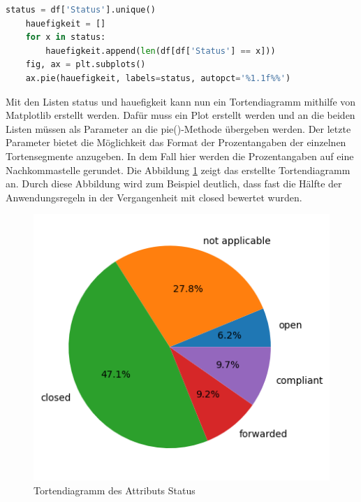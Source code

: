 \begin{lstlisting}[language = python, caption={Visualisierung des Attributs Status},captionpos=b, label = lst:StatusPie, floatplacement=H]
    status = df['Status'].unique()
    hauefigkeit = []
    for x in status:
        hauefigkeit.append(len(df[df['Status'] == x]))
    fig, ax = plt.subplots()
    ax.pie(hauefigkeit, labels=status, autopct='%1.1f%%')
\end{lstlisting}

Mit den Listen \glqq status\grqq{} und \glqq hauefigkeit\grqq{} kann nun ein Tortendiagramm mithilfe von Matplotlib erstellt werden.
Dafür muss ein Plot erstellt werden und an die beiden Listen müssen als Parameter an die pie()-Methode übergeben werden.
Der letzte Parameter bietet die Möglichkeit das Format der Prozentangaben der einzelnen Tortensegmente anzugeben. In dem Fall hier werden die Prozentangaben auf eine Nachkommastelle
gerundet. Die Abbildung \ref*{fig:StatusPie} zeigt das erstellte Tortendiagramm an. Durch diese Abbildung wird zum Beispiel deutlich, dass fast die Hälfte der 
Anwendungsregeln in der Vergangenheit mit \glqq closed\grqq{} bewertet wurden.

\begin{figure}[H]
    \centering
    \includegraphics[width = \textwidth/2]{abbildungen/Status.png}
    \caption{Tortendiagramm des Attributs Status}
    \label{fig:StatusPie}
\end{figure}

